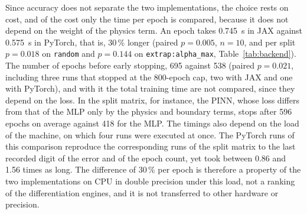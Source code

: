 \documentclass[subscriptcorrection,upint,varvw,barcolor=Goldenrod3,mathalfa=cal=euler,balance,hyphenate,french,pdf-a]{asmejour} %
\begin{document}
Since accuracy does not separate the two implementations, the choice rests on cost, and of the cost only the time per epoch is compared, because it does not depend on the weight of the physics term. An epoch takes 0.745~s in JAX against 0.575~s in PyTorch, that is, 30\,\% longer (paired $p=0.005$, $n=10$, and per split $p=0.018$ on \texttt{random} and $p=0.144$ on \texttt{extrap:alpha\_max}, Table~\ref{tab:backend}). The number of epochs before early stopping, 695 against 538 (paired $p=0.021$, including three runs that stopped at the 800-epoch cap, two with JAX and one with PyTorch), and with it the total training time are not compared, since they depend on the loss. In the split matrix, for instance, the PINN, whose loss differs from that of the MLP only by the physics and boundary terms, stops after 596 epochs on average against 418 for the MLP. The timings also depend on the load of the machine, on which four runs were executed at once. The PyTorch runs of this comparison reproduce the corresponding runs of the split matrix to the last recorded digit of the error and of the epoch count, yet took between 0.86 and 1.56 times as long. %
The difference of 30\,\% per epoch is therefore a property of the two implementations on CPU in double precision under this load, not a ranking of the differentiation engines, and it is not transferred to other hardware or precision.
\end{document}
